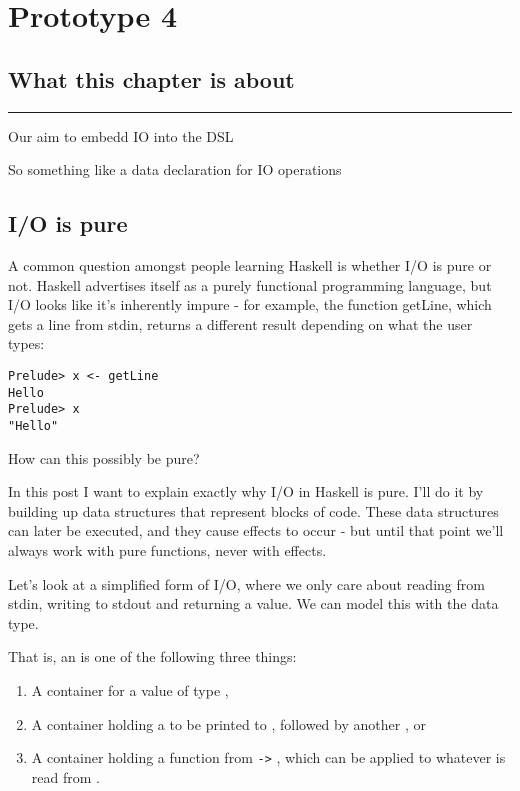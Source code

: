 \documentclass[thesis-solanki.tex]{subfiles}
\begin{document}
\chapter{Prototype 4}{\label{proto4}}


\section{What this chapter is about}

\noindent\rule{\textwidth}{0.5pt}

Our aim to embedd IO into the DSL

So something like a data declaration for IO operations

\section{I/O is pure}

\cite{website:ioispurechristaylor}

A common question amongst people learning Haskell is whether I/O is pure or not. Haskell advertises itself as a purely functional 
programming language, but I/O looks like it’s inherently impure - for example, the function getLine, which gets a line from stdin, returns 
a different result depending on what the user types:

\begin{verbatim}
Prelude> x <- getLine
Hello
Prelude> x
"Hello"
\end{verbatim}

How can this possibly be pure?

In this post I want to explain exactly why I/O in Haskell is pure. I’ll do it by building up data structures that represent blocks of code. 
These data structures can later be executed, and they cause effects to occur - but until that point we’ll always work with pure functions, 
never with effects.

Let’s look at a simplified form of I/O, where we only care about reading from stdin, writing to stdout and returning a value. We can model 
this with the  data type.

That is, an  is one of the following three things:
\begin{enumerate}
\item A container for a value of type ,

\item A container holding a  to be printed to ,
  followed by another , or

\item A container holding a function from  \Verb!->! , which can be applied
  to whatever  is read from . 
\end{enumerate}
\end{document}
